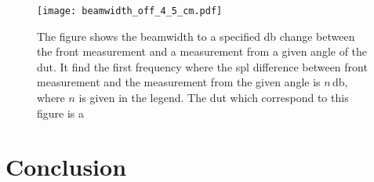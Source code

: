 \begin{figure}[H]
	\centering
	\texttt{[image: beamwidth\_off\_4\_5\_cm.pdf]}
	\caption{The figure shows the beamwidth to a specified \si{\decibel} change between the front measurement and a measurement from a given angle of the \gls{dut}. It find the first frequency where the \gls{spl} difference between front measurement and the measurement from the given angle is $n$\,\si{\decibel}, where $n$ is given in the legend. The \gls{dut} which correspond to this figure is a \citep{seas33}}
		\label{fig:beamwidth_offset_4.5_cm}
\end{figure}

\section{Conclusion}